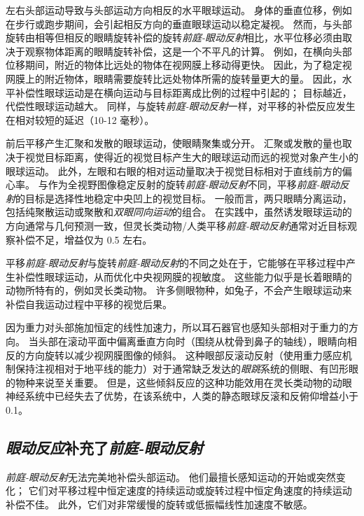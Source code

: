 左右头部运动导致与头部运动方向相反的水平眼球运动。
身体的垂直位移，例如在步行或跑步期间，会引起相反方向的垂直眼球运动以稳定凝视。
然而，与头部旋转由相等但相反的眼睛旋转补偿的旋转\textit{前庭-眼动反射}相比，水平位移必须由取决于观察物体距离的眼睛旋转补偿，这是一个不平凡的计算。
例如，在横向头部位移期间，附近的物体比远处的物体在视网膜上移动得更快。
因此，为了稳定视网膜上的附近物体，眼睛需要旋转比远处物体所需的旋转量更大的量。
因此，水平补偿性眼球运动是在横向运动与目标距离成比例的过程中引起的；
目标越近，代偿性眼球运动越大。
同样，与旋转\textit{前庭-眼动反射}一样，对平移的补偿反应发生在相对较短的延迟（10-12 毫秒）。


前后平移产生汇聚和发散的眼球运动，使眼睛聚集或分开。
汇聚或发散的量也取决于视觉目标距离，使得近的视觉目标产生大的眼球运动而远的视觉对象产生小的眼球运动。
此外，左眼和右眼的相对运动量取决于视觉目标相对于直线前方的偏心率。
与作为全视野图像稳定反射的旋转\textit{前庭-眼动反射}不同，平移\textit{前庭-眼动反射}的目标是选择性地稳定中央凹上的视觉目标。
一般而言，两只眼睛分离运动，包括纯聚散运动或聚散和\textit{双眼同向运动}的组合。
在实践中，虽然诱发眼球运动的方向通常与几何预测一致，但灵长类动物/人类平移\textit{前庭-眼动反射}通常对近目标观察补偿不足，增益仅为 0.5 左右。


平移\textit{前庭-眼动反射}与旋转\textit{前庭-眼动反射}的不同之处在于，它能够在平移过程中产生补偿性眼球运动，从而优化中央视网膜的视敏度。
这些能力似乎是长着眼睛的动物所特有的，例如灵长类动物。
许多侧眼物种，如兔子，不会产生眼球运动来补偿自我运动过程中平移的视觉后果。


因为重力对头部施加恒定的线性加速力，所以耳石器官也感知头部相对于重力的方向。
当头部在滚动平面中偏离垂直方向时（围绕从枕骨到鼻子的轴线），眼睛向相反的方向旋转以减少视网膜图像的倾斜。
这种眼部反滚动反射（使用重力感应机制保持注视相对于地平线的能力）对于通常缺乏发达的\textit{眼跳}系统的侧眼、有凹形眼的物种来说至关重要。
但是，这些倾斜反应的这种功能效用在灵长类动物的动眼神经系统中已经失去了优势，在该系统中，人类的静态眼球反滚和反俯仰增益小于 0.1。



\subsection{\textit{眼动反应}补充了\textit{前庭-眼动反射}}

\textit{前庭-眼动反射}无法完美地补偿头部运动。
他们最擅长感知运动的开始或突然变化；
它们对平移过程中恒定速度的持续运动或旋转过程中恒定角速度的持续运动补偿不佳。
此外，它们对非常缓慢的旋转或低振幅线性加速度不敏感。


